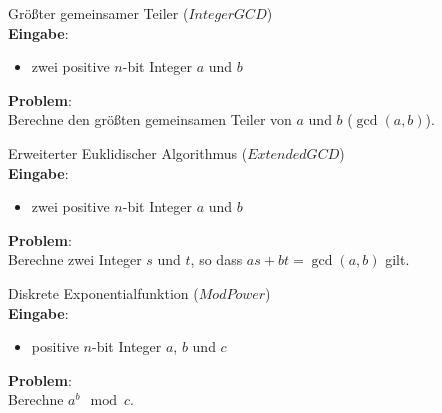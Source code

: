 \begin{problem}
    Größter gemeinsamer Teiler ($IntegerGCD$) \\
    \textbf{Eingabe}:
    \begin{itemize}
        \item zwei positive $n$-bit Integer $a$ und $b$
    \end{itemize}
    \textbf{Problem}: \\
    Berechne den größten gemeinsamen Teiler von $a$ und $b$ ($\gcd(a,b)$).
    \cite[S.229]{greenlaw}
\end{problem}

\begin{problem}
    Erweiterter Euklidischer Algorithmus ($ExtendedGCD$) \\
    \textbf{Eingabe}:
    \begin{itemize}
        \item zwei positive $n$-bit Integer $a$ und $b$
    \end{itemize}
    \textbf{Problem}: \\
    Berechne zwei Integer $s$ und $t$, so dass $as + bt = \gcd(a,b)$ gilt.
    \cite[S.229]{greenlaw}
\end{problem}

\begin{problem}
    Diskrete Exponentialfunktion ($ModPower$) \\
    \textbf{Eingabe}:
    \begin{itemize}
        \item positive $n$-bit Integer $a$, $b$ und $c$
    \end{itemize}
    \textbf{Problem}: \\
    Berechne $a^b \mod c$.
    \cite[S.231]{greenlaw}
\end{problem}
